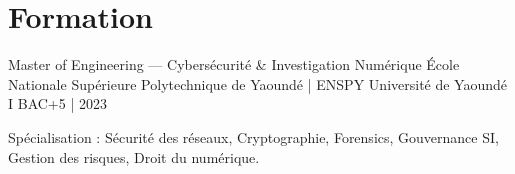 \vspace{-\acvSectionTopSkip}
\section{Formation}
\cventry
{Master of Engineering — Cybersécurité \& Investigation Numérique} %
{École Nationale Supérieure Polytechnique de Yaoundé | ENSPY} %
{Université de Yaoundé I} %
{BAC+5 | 2023} %
\begin{cvitems}
\item {Spécialisation : Sécurité des réseaux, Cryptographie, Forensics, Gouvernance SI, Gestion des risques, Droit du numérique.}
\end{cvitems}

\vspace{3mm}


